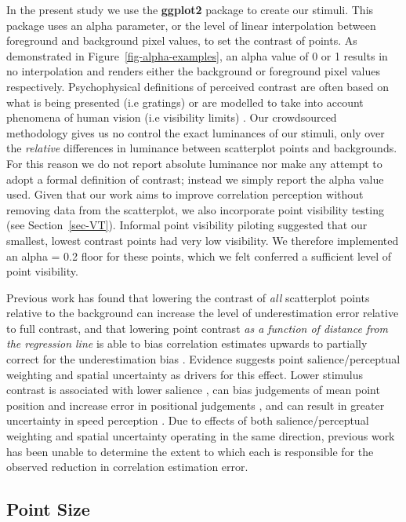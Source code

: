 \documentclass[manuscript, review, anonymous, screen]{acmart}
\begin{document}
In the present study we use the \textbf{ggplot2} package
\citep{hadley_gg2016} to create our stimuli. This package uses an alpha
parameter, or the level of linear interpolation \citep{stone_2008}
between foreground and background pixel values, to set the contrast of
points. As demonstrated in Figure~\ref{fig-alpha-examples}, an alpha
value of 0 or 1 results in no interpolation and renders either the
background or foreground pixel values respectively. Psychophysical
definitions of perceived contrast are often based on what is being
presented (i.e gratings) or are modelled to take into account phenomena
of human vision (i.e visibility limits) \citep{zuffi_2007}. Our
crowdsourced methodology gives us no control the exact luminances of our
stimuli, only over the \emph{relative} differences in luminance between
scatterplot points and backgrounds. For this reason we do not report
absolute luminance nor make any attempt to adopt a formal definition of
contrast; instead we simply report the alpha value used. Given that our
work aims to improve correlation perception without removing data from
the scatterplot, we also incorporate point visibility testing (see
Section~\ref{sec-VT}). Informal point visibility piloting suggested that
our smallest, lowest contrast points had very low visibility. We
therefore implemented an alpha = 0.2 floor for these points, which we
felt conferred a sufficient level of point visibility.

Previous work has found that lowering the contrast of \emph{all}
scatterplot points relative to the background can increase the level of
underestimation error relative to full contrast, and that lowering point
contrast \emph{as a function of distance from the regression line} is
able to bias correlation estimates upwards to partially correct for the
underestimation bias \citep{strain_2023}. Evidence suggests point
salience/perceptual weighting and spatial uncertainty as drivers for
this effect. Lower stimulus contrast is associated with lower salience
\citep{healey_2011}, can bias judgements of mean point position
\citep{hong_2021} and increase error in positional judgements
\citep{wehrhahn_1990}, and can result in greater uncertainty in speed
perception \citep{champion_2017}. Due to effects of both
salience/perceptual weighting and spatial uncertainty operating in the
same direction, previous work \citep{strain_2023} has been unable to
determine the extent to which each is responsible for the observed
reduction in correlation estimation error.

\hypertarget{sec-point-size}{%
\subsection{Point Size}\label{sec-point-size}}
\end{document}

